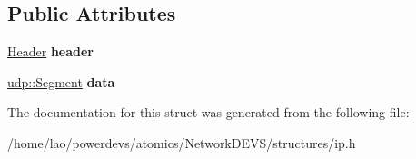 \subsection*{Public Attributes}
\begin{DoxyCompactItemize}
\item 
\hyperlink{structip_1_1Header}{Header} {\bfseries header}\hypertarget{structip_1_1Datagram_ab2f6057ca4c00b3c1d9637a5e7b6c144}{}\label{structip_1_1Datagram_ab2f6057ca4c00b3c1d9637a5e7b6c144}

\item 
\hyperlink{structudp_1_1Segment}{udp\+::\+Segment} {\bfseries data}\hypertarget{structip_1_1Datagram_a4de3ad46fa81bc6d312c2e77321e59d1}{}\label{structip_1_1Datagram_a4de3ad46fa81bc6d312c2e77321e59d1}

\end{DoxyCompactItemize}


The documentation for this struct was generated from the following file\+:\begin{DoxyCompactItemize}
\item 
/home/lao/powerdevs/atomics/\+Network\+D\+E\+V\+S/structures/ip.\+h\end{DoxyCompactItemize}
